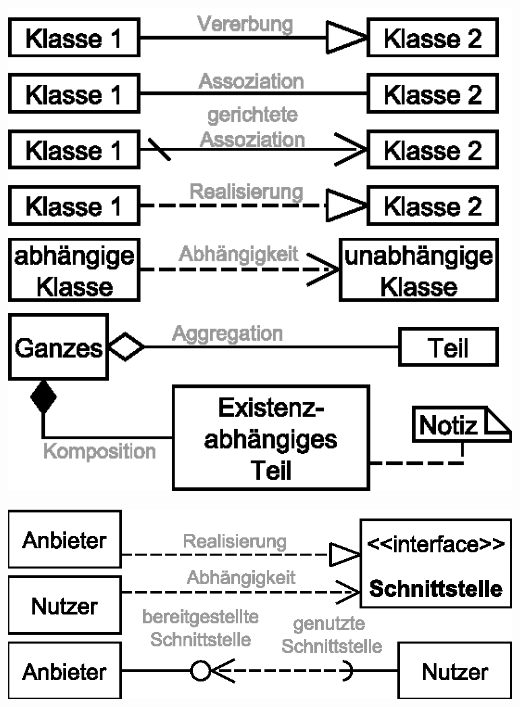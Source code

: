 \documentclass[a4paper,fontsize=9pt, DIV=calc]{scrartcl}
\begin{document}
\begin{multicols}{2}
\begin{center}
\begin{minipage}{0.7\linewidth}\vspace{1cm}
\includegraphics[width=\linewidth]{src/uml_klassen_delegation}
\end{minipage}\hfill%
\begin{minipage}{0.29\linewidth}
\includegraphics[height=\linewidth, angle=90]{src/uml_schnittstellen}
\end{minipage}


\end{center}
\end{multicols}
\end{document}
